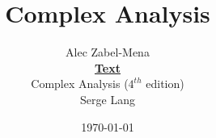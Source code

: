 \documentclass[12pt, twoside]{book}
\title{Complex Analysis}
\author{Alec Zabel-Mena\\ \textbf{\underline{Text}} \\Complex
    Analysis ($4^{th}$ edition) \\ Serge Lang}
\date{\today}
\begin{document}
\maketitle
\tableofcontents



%
%
%
%
%

\nocite{*}



\end{document}
